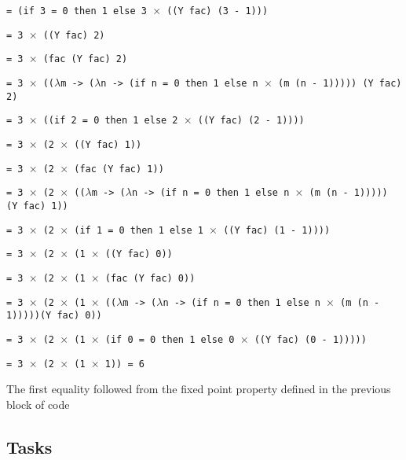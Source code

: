 \documentclass[11pt]{article}
\begin{document}
\hspace{2.5cm}\texttt{= (if 3 = 0 then 1 else 3 $\times$ ((Y fac) (3 - 1)))}

\hspace{2.5cm}\texttt{= 3 $\times$ ((Y fac) 2)}

\hspace{2.5cm}\texttt{= 3 $\times$ (fac (Y fac) 2)}

\hspace{2.5cm}\texttt{= 3 $\times$ (($\lambda$m -> ($\lambda$n -> (if n = 0 then 1 else n $\times$ (m (n - 1))))) (Y fac) 2)}

\hspace{2.5cm}\texttt{= 3 $\times$ ((if 2 = 0 then 1 else 2 $\times$ ((Y fac) (2 - 1))))}

\hspace{2.5cm}\texttt{= 3 $\times$ (2 $\times$ ((Y fac) 1))}

\hspace{2.5cm}\texttt{= 3 $\times$ (2 $\times$ (fac (Y fac) 1))}

\hspace{2.5cm}\texttt{= 3 $\times$ (2 $\times$ (($\lambda$m -> ($\lambda$n -> (if n = 0 then 1 else n $\times$ (m (n - 1))))) (Y fac) 1))}

\hspace{2.5cm}\texttt{= 3 $\times$ (2 $\times$ (if 1 = 0 then 1 else 1 $\times$ ((Y fac) (1 - 1))))}

\hspace{2.5cm}\texttt{= 3 $\times$ (2 $\times$ (1 $\times$ ((Y fac) 0))}

\hspace{2.5cm}\texttt{= 3 $\times$ (2 $\times$ (1 $\times$ (fac (Y fac) 0))}

\hspace{2.5cm}\texttt{= 3 $\times$ (2 $\times$ (1 $\times$ (($\lambda$m -> ($\lambda$n -> (if n = 0 then 1 else n $\times$ (m (n - 1)))))(Y fac) 0))}

\hspace{2.5cm}\texttt{= 3 $\times$ (2 $\times$ (1 $\times$ (if 0 = 0 then 1 else 0 $\times$ ((Y fac) (0 - 1)))))}

\hspace{2.5cm}\texttt{= 3 $\times$ (2 $\times$ (1 $\times$ 1)) = 6}
\normalsize

The first equality followed from the fixed point property defined in the previous block of code

\subsection{Tasks}
\end{document}
